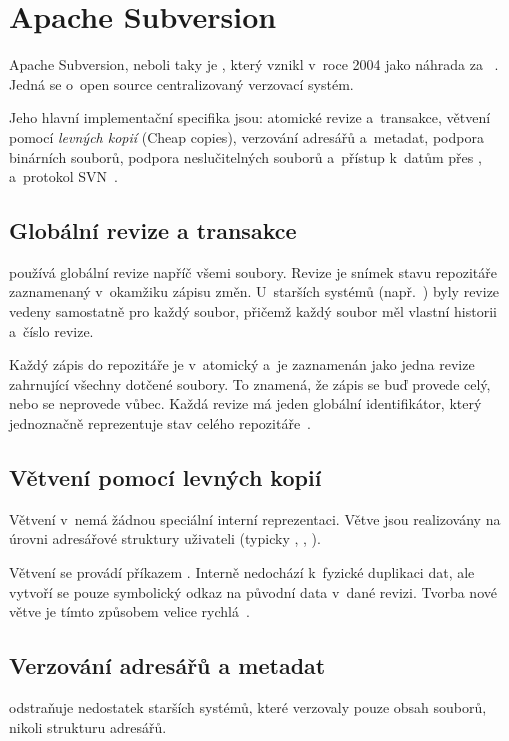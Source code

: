 \section{Apache Subversion}
\label{sec:svn}
Apache Subversion, neboli taky \SVN je \VCS, který vznikl v~roce 2004 jako náhrada za \CVS~\cite{svnbook17}. Jedná se o~open source centralizovaný verzovací systém.

Jeho hlavní implementační specifika jsou: atomické revize a~transakce, větvení pomocí \textit{levných kopií} (Cheap copies), verzování adresářů a~metadat, podpora binárních souborů, podpora neslučitelných souborů a~přístup k~datům přes \HTTP, \HTTPS a~protokol SVN~\cite{svnbook17}.

\subsection*{Globální revize a transakce}
\label{sec:svn_revisions}
\SVN používá globální revize napříč všemi soubory. Revize je snímek stavu repozitáře zaznamenaný v~okamžiku zápisu změn. U~starších systémů (např.\ \CVS) byly revize vedeny samostatně pro každý soubor, přičemž každý soubor měl vlastní historii a~číslo revize.

Každý zápis do repozitáře je v~\SVN atomický a~je zaznamenán jako jedna revize zahrnující všechny dotčené soubory. To znamená, že zápis se buď provede celý, nebo se neprovede vůbec. Každá revize má jeden globální identifikátor, který jednoznačně reprezentuje stav celého repozitáře~\cite{svnbook17}.


\subsection*{Větvení pomocí levných kopií}
\label{sec:svn_branching}
Větvení v~\SVN nemá žádnou speciální interní reprezentaci. Větve jsou realizovány na úrovni adresářové struktury uživateli (typicky , , ).

Větvení se provádí příkazem . Interně nedochází k~fyzické duplikaci dat, ale vytvoří se pouze symbolický odkaz na původní data v~dané revizi. Tvorba nové větve je tímto způsobem velice rychlá~\cite{svnbook17}.


\subsection*{Verzování adresářů a metadat}
\label{sec:svn_metadata}
\SVN odstraňuje nedostatek starších systémů, které verzovaly pouze obsah souborů, nikoli strukturu adresářů.

